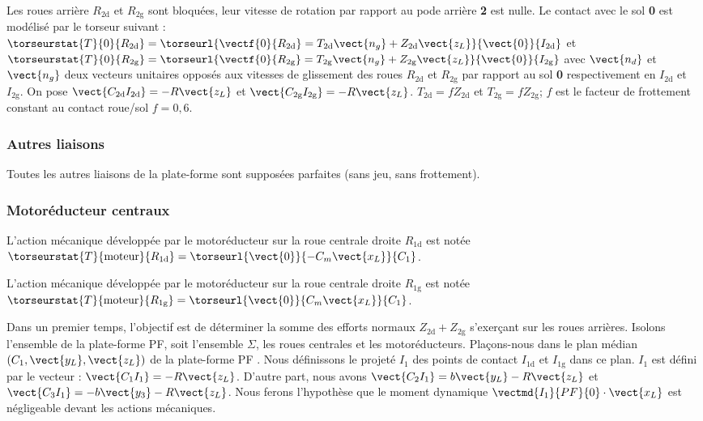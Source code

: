 \begin{multicols}{2}
Les roues arrière $R_{\text{2d}}$ et $R_{\text{2g}}$ sont bloquées, leur vitesse de rotation par rapport au pode arrière \textbf{2} est nulle. Le
contact avec le sol \textbf{0} est modélisé par le torseur suivant :
$\torseurstat{T}{0}{R_{\text{2d}}}=\torseurl{\vectf{0}{R_{\text{2d}}} =T_{\text{2d}}\vect{n_g}+Z_{\text{2d}}\vect{z_L} }{\vect{0}}{I_{\text{2d}}}$ et
$\torseurstat{T}{0}{R_{\text{2g}}}=\torseurl{\vectf{0}{R_{\text{2g}}} =T_{\text{2g}}\vect{n_g}+Z_{\text{2g}}\vect{z_L} }{\vect{0}}{I_{\text{2g}}}$  avec 
$\vect{n_d}$ et $\vect{n_g}$
deux vecteurs unitaires opposés aux vitesses de glissement des roues $R_{\text{2d}}$ et $R_{\text{2g}}$ par rapport au sol 
\textbf{0} respectivement en $I_{\text{2d}}$ et $I_{\text{2g}}$.
On pose $\vect{C_{\text{2d}}I_{\text{2d}}}=-R\vect{z_L}$
et $\vect{C_{\text{2g}}I_{\text{2g}}}=-R\vect{z_L}$.
$T_{\text{2d}}=fZ_{\text{2d}}$ et $T_{\text{2g}}=fZ_{\text{2g}}$; $f$ est le facteur de frottement constant au contact roue/sol $f=0,6$.

\subsubsection*{Autres liaisons}

Toutes les autres liaisons de la plate-forme sont supposées parfaites (sans jeu, sans frottement).

\subsubsection*{Motoréducteur centraux}


L’action mécanique développée par le motoréducteur sur la roue centrale droite $R_{\text{1d}}$ est notée
$\torseurstat{T}{\text{moteur}}{R_{\text{\text{1d}}}}
=\torseurl{\vect{0}}{-C_m\vect{x_L}}{C_1}$.

L’action mécanique développée par le motoréducteur sur la roue centrale droite $R_{\text{1g}}$ est notée
$\torseurstat{T}{\text{moteur}}{R_{\text{\text{1g}}}}
=\torseurl{\vect{0}}{C_m\vect{x_L}}{C_1}$.


\fi


\ifprof
\begin{corrige}
\end{corrige}
\else
\fi


Dans un premier temps, l’objectif est de déterminer la somme des efforts normaux $Z_{\text{2d}} + Z_{\text{2g}} $ s’exerçant sur les roues arrières. Isolons l’ensemble de la plate-forme PF, soit l’ensemble $\Sigma$, les roues centrales et les  motoréducteurs.
Plaçons-nous dans le plan médian $\left( C_1, \vect{y_L}, \vect{z_L}\right)$ de la plate-forme PF . Nous définissons le projeté $I_1$ des points de
contact $I_{\text{1d}}$ et $I_{\text{1g}}$ dans ce plan. $I_1$ est défini par le vecteur : $\vect{C_1I_1}=-R\vect{z_L}$. D’autre part, nous avons 
$\vect{C_2I_1}=b\vect{y_L}-R\vect{z_L}$ et $\vect{C_3I_1}=-b\vect{y_3}-R\vect{z_L}$.
Nous ferons l’hypothèse que le moment dynamique $\vectmd{I_1}{PF}{0} \cdot \vect{x_L}$
est négligeable devant les actions mécaniques.





\end{multicols}
